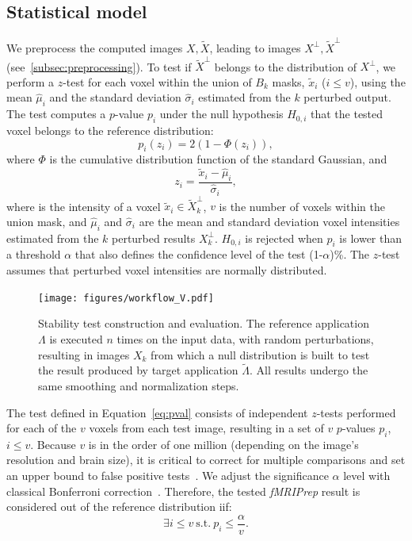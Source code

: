 \documentclass[lettersize,journal]{IEEEtran}
\newcommand{\fmriprep}{\emph{fMRIPrep}\xspace}
\newcommand{\add}[1]{\textcolor{green!60!black}{#1}} %
\begin{document}
\subsection{Statistical model}
\label{subsec:statistical_model}

We preprocess the computed images $X,\tilde X$, leading to images $X^\perp,
  \tilde X^\perp$ (see~\ref{subsec:preprocessing}). To test if $\tilde X^\perp$
belongs to the distribution of $X^\perp$, we perform a $z$-test for each voxel
within the union of $B_k$ masks, $\tilde x_i$ ($i\leq v$), using the mean $\hat
  \mu_i$ and the standard deviation $\hat \sigma_i$ estimated from the $k$
perturbed output. The test computes a $p$-value $p_i$ under the null hypothesis
$H_{0,i}$ that the tested voxel belongs to the reference distribution:
\begin{equation} \label{eq:pval}
  p_i(z_i) = 2 \left(1-\Phi(z_i)\right),
\end{equation}
where $\Phi$ is the cumulative distribution function of the \add{standard} Gaussian, and
\begin{equation*}
  z_i = \frac{\tilde x_i-\hat \mu_i}{\hat \sigma_i},
\end{equation*}
where is the intensity of a voxel $\tilde x_i \in \tilde X_k^\perp$, $v$ is the number of voxels within the union mask,
and $\hat \mu_i$ and $\hat \sigma_i$ are the mean and standard deviation voxel intensities estimated
from the $k$ perturbed results $X_k^\perp$.
$H_{0,i}$ is rejected when $p_i$ is lower than a threshold $\alpha$ that also defines the confidence level of the test (1-$\alpha$)\%.
The $z$-test assumes that perturbed voxel intensities are normally distributed.

\begin{figure}
  \centering
  \texttt{[image: figures/workflow\_V.pdf]}
  \caption{Stability test construction and evaluation. The reference application $\Lambda$ is executed $n$ times on the input data, with random perturbations, resulting in images $X_k$ from which a null distribution is built to test the result produced by target application $\tilde \Lambda$. All results undergo the same smoothing and normalization steps.}
  \label{fig:test_workflow}
\end{figure}

The test defined in Equation~\ref{eq:pval} consists of independent $z$-tests
performed for each of the $v$ voxels from each test image, resulting in a set
of $v$ $p$-values $p_i$, $i \leq v$. Because $v$ is in the order of one million
(depending on the image's resolution and brain size), it is critical to correct
for multiple comparisons and set an upper bound to false positive
tests~\cite{NICHOLS2007246}. We adjust the significance $\alpha$ level with
classical Bonferroni correction~\cite{farcomeni2008review}. Therefore, the
tested \fmriprep result is considered out of the reference distribution iif:
\begin{equation}
  \label{eq:bonferroni}
  \exists i \leq v \ \text{s.t.} \ p_i \leq \frac{\alpha}{v}.
\end{equation}
\end{document}
